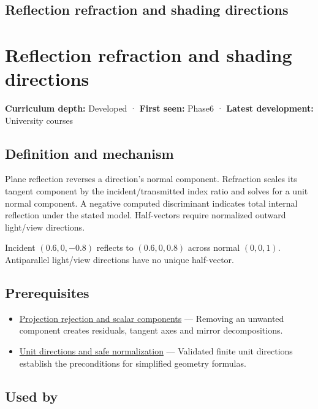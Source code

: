 \hypertarget{appendix-44e00863b4d5}{}
\section*{Reflection refraction and shading directions}
\chapter{Reflection refraction and shading directions}\label{appendix-44e00863b4d5-reflection-refraction-and-shading-directions}

\textbf{Curriculum depth:} Developed · \textbf{First seen:} Phase6 · \textbf{Latest development:} University courses

\section{Definition and mechanism}\label{appendix-44e00863b4d5-definition-and-mechanism}

Plane reflection reverses a direction's normal component. Refraction scales its tangent component by the incident/transmitted index ratio and solves for a unit normal component. A negative computed discriminant indicates total internal reflection under the stated model. Half-vectors require normalized outward light/view directions.

Incident \((0.6,0,-0.8)\) reflects to \((0.6,0,0.8)\) across normal \((0,0,1)\). Antiparallel light/view directions have no unique half-vector.

\section{Prerequisites}\label{appendix-44e00863b4d5-prerequisites}

\begin{itemize}
\tightlist
\item
  \hyperref[appendix-505a502c372a]{Projection rejection and scalar components} --- Removing an unwanted component creates residuals, tangent axes and mirror decompositions.
\item
  \hyperref[appendix-f744e41b95b4]{Unit directions and safe normalization} --- Validated finite unit directions establish the preconditions for simplified geometry formulas.
\end{itemize}

\section{Used by}\label{appendix-44e00863b4d5-used-by}

